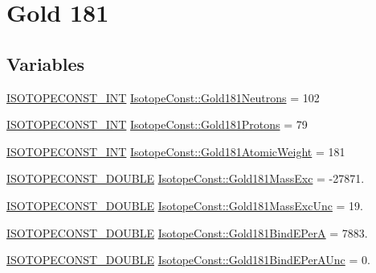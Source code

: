 \hypertarget{group___isotope_const-_gold-_au181}{}\section{Gold 181}
\label{group___isotope_const-_gold-_au181}
\subsection*{Variables}
\begin{DoxyCompactItemize}
\item 
\mbox{\hyperlink{group___isotope_const-_macros_ga5f18360b3e99483a35c32d789e62621c}{I\+S\+O\+T\+O\+P\+E\+C\+O\+N\+S\+T\+\_\+\+I\+NT}} \mbox{\hyperlink{group___isotope_const-_gold-_au181_gad2dbc7d894b71937e8e2d815badb7c1a}{Isotope\+Const\+::\+Gold181\+Neutrons}} = 102
\item 
\mbox{\hyperlink{group___isotope_const-_macros_ga5f18360b3e99483a35c32d789e62621c}{I\+S\+O\+T\+O\+P\+E\+C\+O\+N\+S\+T\+\_\+\+I\+NT}} \mbox{\hyperlink{group___isotope_const-_gold-_au181_gac01604320ca71469d3ef89b69df1a3e8}{Isotope\+Const\+::\+Gold181\+Protons}} = 79
\item 
\mbox{\hyperlink{group___isotope_const-_macros_ga5f18360b3e99483a35c32d789e62621c}{I\+S\+O\+T\+O\+P\+E\+C\+O\+N\+S\+T\+\_\+\+I\+NT}} \mbox{\hyperlink{group___isotope_const-_gold-_au181_ga7dd57e17928460a4e65822ea5eef1b61}{Isotope\+Const\+::\+Gold181\+Atomic\+Weight}} = 181
\item 
\mbox{\hyperlink{group___isotope_const-_macros_ga8f45a7272ce02c0b4c65c44636ed719a}{I\+S\+O\+T\+O\+P\+E\+C\+O\+N\+S\+T\+\_\+\+D\+O\+U\+B\+LE}} \mbox{\hyperlink{group___isotope_const-_gold-_au181_ga1c0cb176d431733fbce7f456e4fc33f2}{Isotope\+Const\+::\+Gold181\+Mass\+Exc}} = -\/27871.
\item 
\mbox{\hyperlink{group___isotope_const-_macros_ga8f45a7272ce02c0b4c65c44636ed719a}{I\+S\+O\+T\+O\+P\+E\+C\+O\+N\+S\+T\+\_\+\+D\+O\+U\+B\+LE}} \mbox{\hyperlink{group___isotope_const-_gold-_au181_ga6b98f6ab20dec5f4ef9ab721f6e58f30}{Isotope\+Const\+::\+Gold181\+Mass\+Exc\+Unc}} = 19.
\item 
\mbox{\hyperlink{group___isotope_const-_macros_ga8f45a7272ce02c0b4c65c44636ed719a}{I\+S\+O\+T\+O\+P\+E\+C\+O\+N\+S\+T\+\_\+\+D\+O\+U\+B\+LE}} \mbox{\hyperlink{group___isotope_const-_gold-_au181_ga9d941fc4659119aa14f4ec19a9d0d260}{Isotope\+Const\+::\+Gold181\+Bind\+E\+PerA}} = 7883.
\item 
\mbox{\hyperlink{group___isotope_const-_macros_ga8f45a7272ce02c0b4c65c44636ed719a}{I\+S\+O\+T\+O\+P\+E\+C\+O\+N\+S\+T\+\_\+\+D\+O\+U\+B\+LE}} \mbox{\hyperlink{group___isotope_const-_gold-_au181_ga72385fd2f4ac32f032ea4ea2288ade2f}{Isotope\+Const\+::\+Gold181\+Bind\+E\+Per\+A\+Unc}} = 0.

\end{DoxyCompactItemize}
